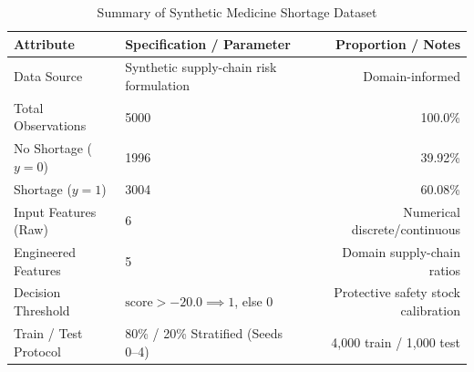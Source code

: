 \begin{table}[htbp]
\centering
\caption{Summary of Synthetic Medicine Shortage Dataset}
\label{tab:dataset_summary}
\begin{tabular}{llr}
\toprule
\textbf{Attribute} & \textbf{Specification / Parameter} & \textbf{Proportion / Notes} \\
\midrule
Data Source & Synthetic supply-chain risk formulation & Domain-informed \\
Total Observations & 5000 & 100.0\% \\
No Shortage ($y = 0$) & 1996 & 39.92\% \\
Shortage ($y = 1$) & 3004 & 60.08\% \\
Input Features (Raw) & 6 & Numerical discrete/continuous \\
Engineered Features & 5 & Domain supply-chain ratios \\
Decision Threshold & $\text{score} > -20.0 \implies 1$, else $0$ & Protective safety stock calibration \\
Train / Test Protocol & 80\% / 20\% Stratified (Seeds 0--4) & 4,000 train / 1,000 test \\
\bottomrule
\end{tabular}
\end{table}
